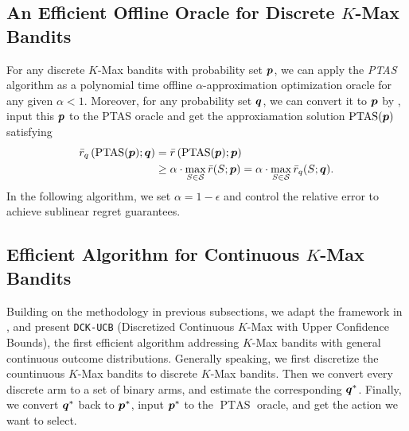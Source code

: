 \subsection{An Efficient Offline Oracle for Discrete $K$-Max Bandits} \label{sec:offline-oracle}
For any discrete $K$-Max bandits with probability set ${\bm{p}}$, we can apply the \textit{PTAS} algorithm \citep{chen2016combinatorial} as a polynomial time offline $\alpha$-approximation optimization oracle for any given $\alpha < 1$. 
Moreover, for any probability set ${\bm{q}}$, we can convert it to ${\bm{p}}$ by , input this ${\bm{p}}$ to the PTAS oracle and get the approxiamation solution $\operatorname{PTAS}({\bm{p}})$ satisfying
\begin{equation}\label{eq:ptas}
\begin{aligned}
    \bar r_q\left(\operatorname{PTAS}({\bm{p}}); {\bm{q}}\right) &= \bar r\left(\operatorname{PTAS}({\bm{p}}); {\bm{p}}\right) \\
    &\ge \alpha \cdot \max_{S \in {\mathcal{S}}} \bar r(S; {\bm{p}}) = \alpha \cdot \max_{S \in {\mathcal{S}}} \bar r_q(S; {\bm{q}}).
\end{aligned}
\end{equation}
In the following algorithm, we set $\alpha = 1-\epsilon$ and control the relative error to achieve sublinear regret guarantees.



\subsection{Efficient Algorithm for Continuous $K$-Max Bandits}\label{sec:algorithm}
Building on the methodology in previous subsections, we adapt the framework in \citet{wang2023combinatorial}, and
present \texttt{DCK-UCB} (Discretized Continuous $K$-Max with Upper Confidence Bounds), the first efficient algorithm addressing $K$-Max bandits with general continuous outcome distributions. 
%
Generally speaking, we first discretize the countinuous $K$-Max bandits to discrete $K$-Max bandits. Then we convert every discrete arm to a set of binary arms, and estimate the corresponding ${\bm{q}}^*$. Finally, we convert ${\bm{q}}^*$ back to ${\bm{p}}^*$, input ${\bm{p}}^*$ to the $\operatorname{PTAS}$ oracle, and get the action we want to select.
%
% 

